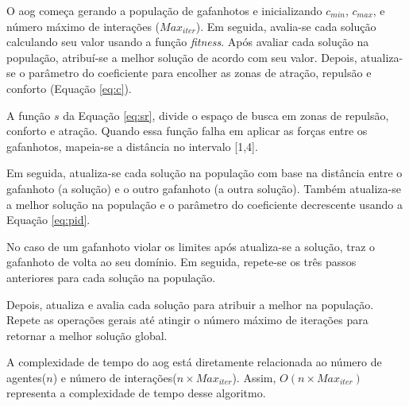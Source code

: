 O \ac{aog} começa gerando a população de gafanhotos e inicializando $c_{min}$, $c_{max}$, e número máximo de interações ($Max_{iter}$). Em seguida, avalia-se cada solução calculando seu valor usando a função \textit{fitness}. Após avaliar cada solução na população, atribuí-se a melhor solução de acordo com seu valor.
Depois, atualiza-se o parâmetro do coeficiente para encolher as zonas de atração, repulsão e conforto (Equação  \ref{eq:c}).

A função $s$ da Equação \ref{eq:sr}, divide o espaço de busca em zonas de
repulsão, conforto e atração. Quando essa função falha em aplicar as forças entre os gafanhotos, mapeia-se a distância no intervalo {[1,4]}. 

Em seguida, atualiza-se cada solução na população com base na distância entre o gafanhoto (a solução) e o outro gafanhoto (a outra solução). Também atualiza-se a melhor solução na população e o parâmetro do coeficiente decrescente usando a Equação \ref{eq:pid}.

No caso de um gafanhoto violar os limites após atualiza-se a solução, traz o gafanhoto de volta ao seu domínio. Em seguida, repete-se os três passos anteriores para cada solução na população.

Depois, atualiza e avalia cada solução para atribuir a melhor na população. Repete as operações gerais até atingir o número máximo de iterações para retornar a melhor solução global.

A complexidade de tempo do \ac{aog} está diretamente relacionada ao número de agentes($n$) e número de interações($n \times Max_{iter}$). Assim, $O(n \times Max_{iter})$ representa a complexidade de tempo desse algoritmo. \cite{GOA_web}